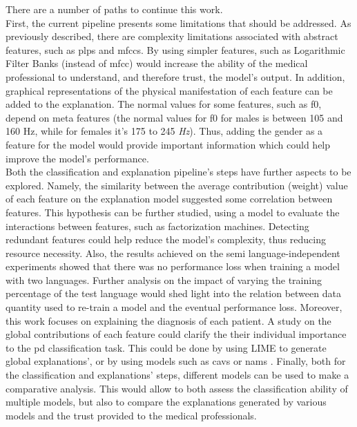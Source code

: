 There are a number of paths to continue this work. \\
First, the current pipeline presents some limitations that should be addressed. As previously described, there are complexity limitations associated with abstract features, such as \gls{plp}s and \gls{mfcc}s. By using simpler features, such as Logarithmic Filter Banks (instead of \gls{mfcc}) would increase the ability of the medical professional to understand, and therefore trust, the model's output. In addition, graphical representations of the physical manifestation of each feature can be added to the explanation. The normal values for some features, such as \gls{f0}, depend on meta features (the normal values for \gls{f0} for males is between 105 and 160 Hz, while for females it's 175 to 245 \textit{Hz}). Thus, adding the gender as a feature for the model would provide important information which could help improve the model's performance. \\
Both the classification and explanation pipeline's steps have further aspects to be explored. Namely, the similarity between the average contribution (weight) value of each feature on the explanation model suggested some correlation between features. This hypothesis can be further studied, using a model to evaluate the interactions between features, such as factorization machines. Detecting redundant features could help reduce the model's complexity, thus reducing resource necessity. Also, the results achieved on the semi language-independent experiments showed that there was no performance loss when training a model with two languages. Further analysis on the impact of varying the training percentage of the test language would shed light into the relation between data quantity used to re-train a model and the eventual performance loss. Moreover, this work focuses on explaining the diagnosis of each patient. A study on the global contributions of each feature could clarify the their individual importance to the \gls{pd} classification task. This could be done by using LIME to generate global explanations', or by using models such as \gls{cav}s \cite{TCAV} or \gls{nam}s \cite{NAM}. Finally, both for the classification and explanations' steps, different models can be used to make a comparative analysis. This would allow to both assess the classification ability of multiple models, but also to compare the explanations generated by various models and the trust provided to the medical professionals. \\
